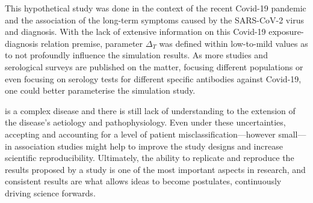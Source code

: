 This hypothetical study was done in the context of the recent Covid-19 pandemic and the association of the long-term symptoms caused by the SARS-CoV-2 virus and \cfs diagnosis. With the lack of extensive information on this Covid-19 exposure-\cfs diagnosis relation premise, parameter $\Delta_T$ was defined within low-to-mild values as to not profoundly influence the simulation results. As more studies and serological surveys are published on the matter, focusing different populations or even focusing on serology tests for different specific antibodies against Covid-19, one could better parameterise the simulation study.

\cfs is a complex disease and there is still lack of understanding to the extension of the disease's aetiology and pathophysiology. Even under these uncertainties, accepting and accounting for a level of patient misclassification---however small---in association studies might help to improve the study designs and increase scientific reproducibility. Ultimately, the ability to replicate and reproduce the results proposed by a study is one of the most important aspects in research, and consistent results are what allows ideas to become postulates, continuously driving science forwards.






